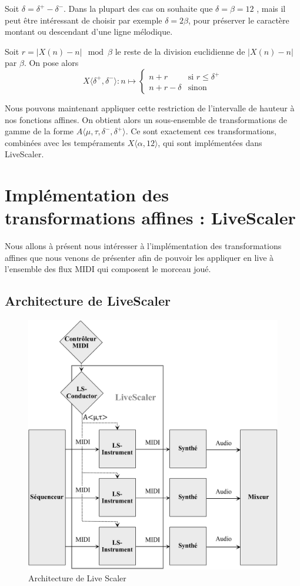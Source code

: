 \documentclass{article}
\begin{document}
Soit $\delta = \delta^+ - \delta^-$.  Dans la plupart des cas on souhaite que $\delta = \beta = 12$ , mais il peut être intéressant de choisir par exemple $\delta  = 2\beta$, pour préserver le caractère montant ou descendant d'une ligne mélodique.

Soit $r = |X(n) - n | \mod \beta$ le reste de la division euclidienne de  $|X(n) - n |$ par $\beta$. On pose alors
$$
X\langle \delta^+, \delta^- \rangle : n \mapsto \begin{cases}
  n + r & \text{si $r \leq \delta^+$}\\
  n + r - \delta & \text{sinon}
\end{cases}
$$

Nous pouvons maintenant appliquer cette restriction de l'intervalle de hauteur à nos fonctions affines. On obtient alors un sous-ensemble de transformations de gamme de la forme $A\langle \mu, \tau, \delta^-, \delta^+\rangle$. Ce sont exactement ces transformations, combinées avec les tempéraments $X\langle \alpha,12\rangle$, qui sont implémentées dans LiveScaler.


\section{Implémentation des transformations affines : LiveScaler}

Nous allons à présent nous intéresser à l'implémentation des transformations affines que nous venons de présenter afin de pouvoir les appliquer en live à l'ensemble des flux MIDI qui composent le morceau joué.

\subsection{Architecture de LiveScaler}

\begin{figure}[htbp]
  \centering
	\includegraphics[width=\columnwidth]{architecture-LS-fr.pdf}
  \caption{Architecture de Live Scaler\label{fig:archi}}
\end{figure}
\end{document}

